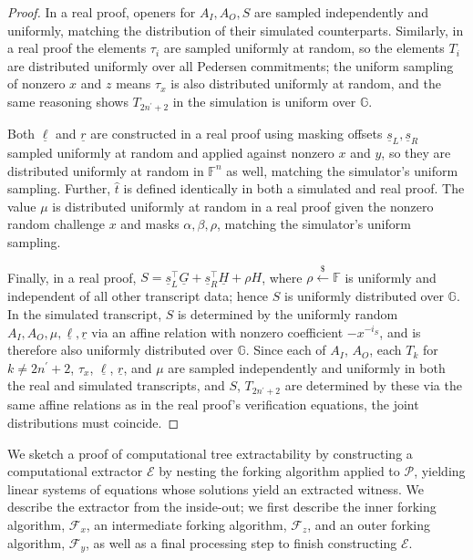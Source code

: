 \documentclass{article}
\theoremstyle{definition}
\newcommand{\samp}{\mathrel{\overset{\$}{\leftarrow}}}
\newcommand{\GG}{\mathbb{G}}
\newcommand{\FF}{\mathbb{F}}
\begin{document}
\begin{proof}
In a real proof, openers for $A_I, A_O, S$ are sampled independently and uniformly, matching the distribution of their simulated counterparts. Similarly, in a real proof the elements $\tau_i$ are sampled uniformly at random, so the elements $T_i$ are distributed uniformly over all Pedersen commitments; the uniform sampling of nonzero $x$ and $z$ means $\tau_x$ is also distributed uniformly at random, and the same reasoning shows $T_{2n^\prime+2}$ in the simulation is uniform over $\GG$.

Both $\underline{\ell}$ and $\underline{r}$ are constructed in a real proof using masking offsets $\underline{s}_L, \underline{s}_R$ sampled uniformly at random and applied against nonzero $x$ and $y$, so they are distributed uniformly at random in $\FF^n$ as well, matching the simulator's uniform sampling. Further, $\widehat{t}$ is defined identically in both a simulated and real proof. The value $\mu$ is distributed uniformly at random in a real proof given the nonzero random challenge $x$ and masks $\alpha, \beta, \rho$, matching the simulator's uniform sampling.

Finally, in a real proof, $S = \underline{s}_L^\top \underline{G} + \underline{s}_R^\top \underline{H} + \rho H$, where $\rho \samp \FF$ is uniformly and independent of all other transcript data; hence $S$ is uniformly distributed over $\GG$. In the simulated transcript, $S$ is determined by the uniformly random $A_I, A_O, \mu, \underline{\ell}, \underline{r}$ via an affine relation with nonzero coefficient $-x^{-i_S}$, and is therefore also uniformly distributed over $\GG$.  Since each of $A_I$, $A_O$, each $T_k$ for $k \neq 2n^\prime + 2$, $\tau_x$, $\underline{\ell}$, $\underline{r}$, and $\mu$ are sampled independently and uniformly in both the real and simulated transcripts, and $S$, $T_{2n^\prime+2}$ are determined by these via the same affine relations as in the real proof's verification equations, the joint distributions must coincide.
\end{proof}

We sketch a proof of computational tree extractability by constructing a computational extractor $\mathcal{E}$ by nesting the forking algorithm \cite{bellare2006multi} applied to $\mathcal{P}$, yielding linear systems of equations whose solutions yield an extracted witness. We describe the extractor from the inside-out; we first describe the inner forking algorithm, $\mathcal{F}_x$, an intermediate forking algorithm, $\mathcal{F}_z$, and an outer forking algorithm, $\mathcal{F}_y$, as well as a final processing step to finish constructing $\mathcal{E}$.
\end{document}
